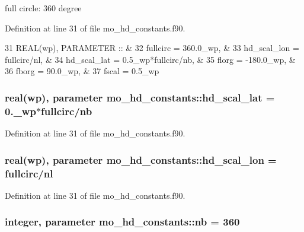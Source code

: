full circle\+: 360 degree 



Definition at line 31 of file mo\+\_\+hd\+\_\+constants.\+f90.


\begin{DoxyCode}
31   \textcolor{keywordtype}{REAL(wp)}, \textcolor{keywordtype}{PARAMETER} :: &
32     fullcirc    = 360.0\_wp,            & 
33     hd\_scal\_lon = fullcirc/nl,         & 
34     hd\_scal\_lat = 0.5\_wp*fullcirc/nb,  & 
35     florg       = -180.0\_wp,           & 
36     fborg       =   90.0\_wp,           & 
37     fscal       =    0.5\_wp              
\end{DoxyCode}
\hypertarget{namespacemo__hd__constants_a6424c9dc04985720e8aa1960333184c7}{}
\subsubsection[{hd\+\_\+scal\+\_\+lat}]{\setlength{\rightskip}{0pt plus 5cm}real(wp), parameter mo\+\_\+hd\+\_\+constants\+::hd\+\_\+scal\+\_\+lat = 0.\+\_\+wp$\ast$fullcirc/nb}\label{namespacemo__hd__constants_a6424c9dc04985720e8aa1960333184c7}


Definition at line 31 of file mo\+\_\+hd\+\_\+constants.\+f90.

\hypertarget{namespacemo__hd__constants_a11321e92ff31b590a466fb310e67da2c}{}
\subsubsection[{hd\+\_\+scal\+\_\+lon}]{\setlength{\rightskip}{0pt plus 5cm}real(wp), parameter mo\+\_\+hd\+\_\+constants\+::hd\+\_\+scal\+\_\+lon = {\bf fullcirc}/{\bf nl}}\label{namespacemo__hd__constants_a11321e92ff31b590a466fb310e67da2c}


Definition at line 31 of file mo\+\_\+hd\+\_\+constants.\+f90.

\hypertarget{namespacemo__hd__constants_a9973287d6e85ff29b6c46662b54e256d}{}
\subsubsection[{nb}]{\setlength{\rightskip}{0pt plus 5cm}integer, parameter mo\+\_\+hd\+\_\+constants\+::nb = 360}\label{namespacemo__hd__constants_a9973287d6e85ff29b6c46662b54e256d}


